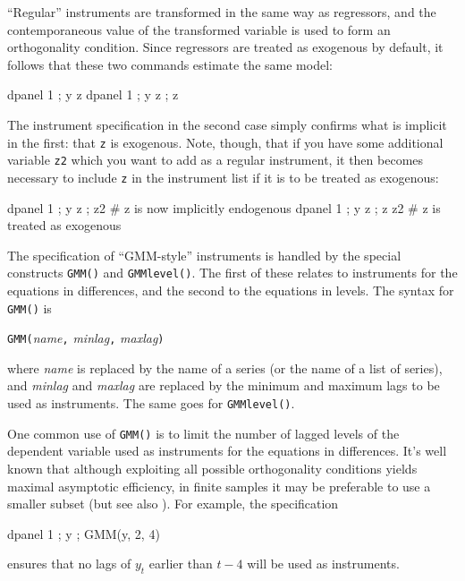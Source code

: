 ``Regular'' instruments are transformed in the same way as
regressors, and the contemporaneous value of the transformed variable
is used to form an orthogonality condition. Since regressors are
treated as exogenous by default, it follows that these two commands
estimate the same model:

\begin{code}
  dpanel 1 ; y z
  dpanel 1 ; y z ; z
\end{code}
The instrument specification in the second case simply confirms what
is implicit in the first: that \texttt{z} is exogenous. Note, though,
that if you have some additional variable \texttt{z2} which you want
to add as a regular instrument, it then becomes necessary to 
include \texttt{z} in the instrument list if it is to be treated
as exogenous:
\begin{code}
  dpanel 1 ; y z ; z2   # z is now implicitly endogenous
  dpanel 1 ; y z ; z z2 # z is treated as exogenous
\end{code}

The specification of ``GMM-style'' instruments is handled by the
special constructs \texttt{GMM()} and \texttt{GMMlevel()}.  The first
of these relates to instruments for the equations in differences, and
the second to the equations in levels. The syntax for \texttt{GMM()}
is

\begin{altcode}
\texttt{GMM(}\textsl{name}\texttt{,} \textsl{minlag}\texttt{,} 
\textsl{maxlag}\texttt{)}
\end{altcode}

\noindent
where \textsl{name} is replaced by the name of a series (or the name
of a list of series), and \textsl{minlag} and \textsl{maxlag} are
replaced by the minimum and maximum lags to be used as
instruments. The same goes for \texttt{GMMlevel()}.

One common use of \texttt{GMM()} is to limit the number of lagged
levels of the dependent variable used as instruments for the equations
in differences. It's well known that although exploiting all possible
orthogonality conditions yields maximal asymptotic efficiency, in
finite samples it may be preferable to use a smaller subset (but see
also \cite{OkuiJoE2009}).  For example, the specification

\begin{code}
  dpanel 1 ; y ; GMM(y, 2, 4)
\end{code}
ensures that no lags of $y_t$ earlier than $t-4$ will be used as
instruments.


